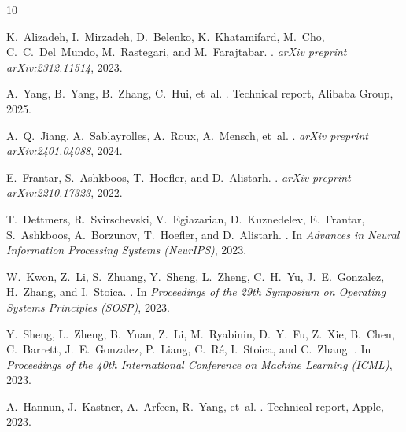 \documentclass[11pt,twocolumn]{article}
\begin{document}

\begin{thebibliography}{10}

K.~Alizadeh, I.~Mirzadeh, D.~Belenko, K.~Khatamifard, M.~Cho, C.~C.~Del~Mundo, M.~Rastegari, and M.~Farajtabar.
.
\newblock \emph{arXiv preprint arXiv:2312.11514}, 2023.

A.~Yang, B.~Yang, B.~Zhang, C.~Hui, et~al.
.
\newblock Technical report, Alibaba Group, 2025.

A.~Q.~Jiang, A.~Sablayrolles, A.~Roux, A.~Mensch, et~al.
.
\newblock \emph{arXiv preprint arXiv:2401.04088}, 2024.

E.~Frantar, S.~Ashkboos, T.~Hoefler, and D.~Alistarh.
.
\newblock \emph{arXiv preprint arXiv:2210.17323}, 2022.

T.~Dettmers, R.~Svirschevski, V.~Egiazarian, D.~Kuznedelev, E.~Frantar, S.~Ashkboos, A.~Borzunov, T.~Hoefler, and D.~Alistarh.
.
\newblock In \emph{Advances in Neural Information Processing Systems (NeurIPS)}, 2023.

W.~Kwon, Z.~Li, S.~Zhuang, Y.~Sheng, L.~Zheng, C.~H.~Yu, J.~E.~Gonzalez, H.~Zhang, and I.~Stoica.
.
\newblock In \emph{Proceedings of the 29th Symposium on Operating Systems Principles (SOSP)}, 2023.

Y.~Sheng, L.~Zheng, B.~Yuan, Z.~Li, M.~Ryabinin, D.~Y.~Fu, Z.~Xie, B.~Chen, C.~Barrett, J.~E.~Gonzalez, P.~Liang, C.~R\'{e}, I.~Stoica, and C.~Zhang.
.
\newblock In \emph{Proceedings of the 40th International Conference on Machine Learning (ICML)}, 2023.

A.~Hannun, J.~Kastner, A.~Arfeen, R.~Yang, et~al.
.
\newblock Technical report, Apple, 2023.


\end{thebibliography}
\end{document}

